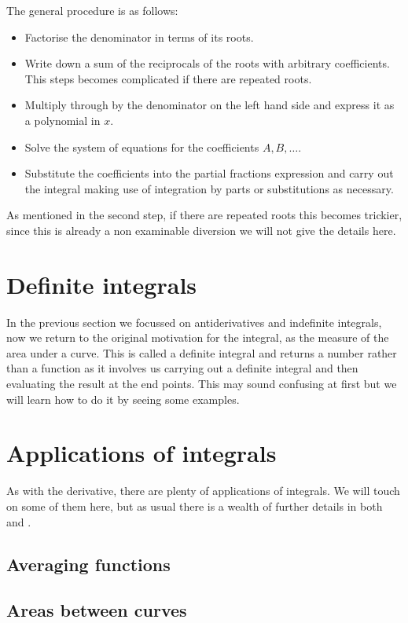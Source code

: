 The general procedure is as follows:
\begin{itemize}
\item Factorise the denominator in terms of its roots.
\item Write down a sum of the reciprocals of the roots with arbitrary coefficients. This steps becomes complicated if there are repeated roots.
\item Multiply through by the denominator on the left hand side and express it as a polynomial in $x$.
\item Solve the system of equations for the coefficients $A, B, \dots{}$.
\item Substitute the coefficients into the partial fractions expression and carry out the integral making use of integration by parts or substitutions as necessary.
\end{itemize}

As mentioned in the second step, if there are repeated roots this becomes trickier, since this is already a non examinable diversion we will not give the details here. 

\section{Definite integrals}

In the previous section we focussed on antiderivatives and indefinite integrals, now we return to the original motivation for the integral, as the measure of the area under a curve. This is called a definite integral and returns a number rather than a function as it involves us carrying out a definite integral and then evaluating the result at the end points. This may sound confusing at first but we will learn how to do it by seeing some examples.

\section{Applications of integrals}
As with the derivative, there are plenty of applications of integrals. We will touch on some of them here, but as usual there is a wealth of further details in both \citep{calcI} and \citep{riley_mathematical_2006}.

\subsection*{Averaging functions}

\subsection*{Areas between curves}

